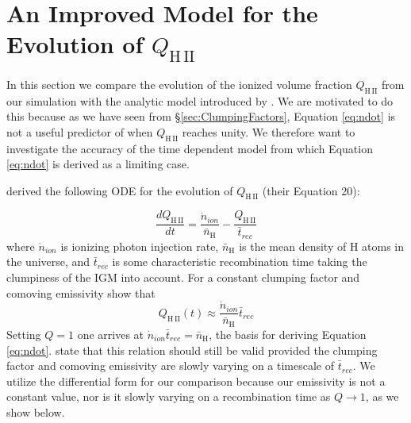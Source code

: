 \section{An Improved Model for the Evolution of $Q_\mathrm{H\,II}$}
\label{Qdot}

In this section we compare the evolution of the ionized volume fraction $Q_\mathrm{H\,II}$ from our simulation with the analytic model introduced by \cite{MadauEtAl1999}. We are motivated to do this because as we have seen from \S\ref{sec:ClumpingFactors}, Equation \eqref{eq:ndot} is not a useful predictor of when $Q_\mathrm{H\,II}$ reaches unity. We therefore want to investigate the accuracy of the time dependent model from which Equation \eqref{eq:ndot} is derived as a limiting case.

 \cite{MadauEtAl1999} derived the following ODE for the evolution of $Q_\mathrm{H\,II}$ (their Equation 20):


\begin{equation}
	\label{eq:dQdt}
	\frac{dQ_\mathrm{H\,II}}{dt} = \frac{\dot{n}_{ion}}{\bar{n}_\mathrm{H}}-\frac{Q_\mathrm{H\,II}}{\bar{t}_{rec}}
\end{equation}
where $\dot{n}_{ion}$ is ionizing photon injection rate, $\bar{n}_\mathrm{H}$ is the mean density of H atoms in the universe, and $\bar{t}_{rec}$ is some characteristic recombination time taking the clumpiness of the IGM into account. For a constant clumping factor and comoving emissivity \cite{MadauEtAl1999} show that 
\begin{equation}
Q_\mathrm{H\,II}(t) \approx \frac{\dot{n}_{ion}}{\bar{n}_\mathrm{H}} \bar{t}_{rec}
\end{equation}
Setting $Q=1$ one arrives at  $\dot{n}_{ion}\bar{t}_{rec}=\bar{n}_\mathrm{H}$, the basis for deriving Equation \eqref{eq:ndot}. \cite{MadauEtAl1999} state that this relation should still be valid provided the clumping factor and comoving emissivity are slowly varying on a timescale of $\bar{t}_{rec}$. We utilize the differential form for our comparison because our emissivity is not a constant value, nor is it slowly varying on a recombination time as $Q \rightarrow 1$, as we show below.  %

